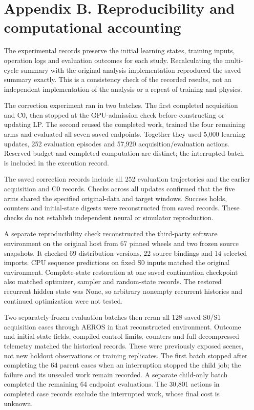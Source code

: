 \documentclass[10pt,letterpaper]{article}
\begin{document}
\section*{Appendix B. Reproducibility and computational
accounting}\label{appendix-b.-reproducibility-and-computational-accounting}

The experimental records preserve the initial learning states, training
inputs, operation logs and evaluation outcomes for each study.
Recalculating the multi-cycle summary with the original analysis
implementation reproduced the saved summary exactly. This is a
consistency check of the recorded results, not an independent
implementation of the analysis or a repeat of training and physics.

The correction experiment ran in two batches. The first completed
acquisition and C0, then stopped at the GPU-admission check before
constructing or updating LP. The second reused the completed work,
trained the four remaining arms and evaluated all seven saved endpoints.
Together they used 5,000 learning updates, 252 evaluation episodes and
57,920 acquisition/evaluation actions. Reserved budget and completed
computation are distinct; the interrupted batch is included in the
execution record.

The saved correction records include all 252 evaluation trajectories and
the earlier acquisition and C0 records. Checks across all updates
confirmed that the five arms shared the specified original-data and
target windows. Success holds, counters and initial-state digests were
reconstructed from saved records. These checks do not establish
independent neural or simulator reproduction.

A separate reproducibility check reconstructed the third-party software
environment on the original host from 67 pinned wheels and two frozen
source snapshots. It checked 69 distribution versions, 22 source
bindings and 14 selected imports. CPU sequence predictions on fixed S0
inputs matched the original environment. Complete-state restoration at
one saved continuation checkpoint also matched optimizer, sampler and
random-state records. The restored recurrent hidden state was None, so
arbitrary nonempty recurrent histories and continued optimization were
not tested.

Two separately frozen evaluation batches then reran all 128 saved S0/S1
acquisition cases through AEROS in that reconstructed environment.
Outcome and initial-state fields, compiled control limits, counters and
full decompressed telemetry matched the historical records. These were
previously exposed scenes, not new holdout observations or training
replicates. The first batch stopped after completing the 64 parent cases
when an interruption stopped the child job; the failure and its unsealed
work remain recorded. A separate child-only batch completed the
remaining 64 endpoint evaluations. The 30,801 actions in completed case
records exclude the interrupted work, whose final cost is unknown.
\end{document}
